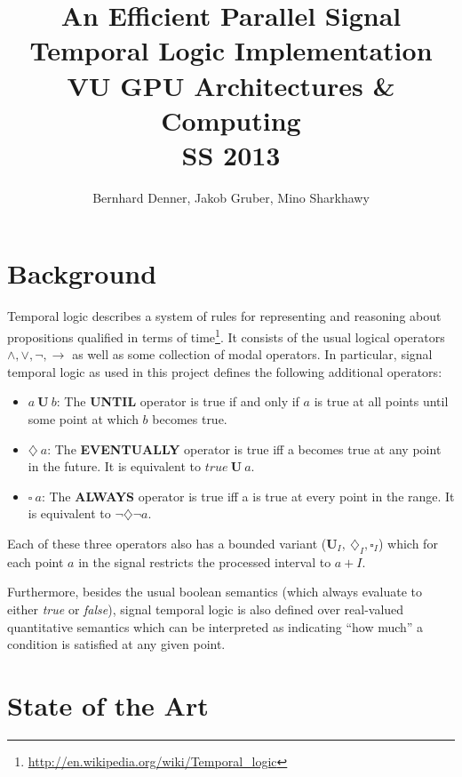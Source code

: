 \documentclass[a4paper,10pt]{article}
\title{
	An Efficient Parallel Signal Temporal Logic Implementation \\
    VU GPU Architectures \& Computing \\
    SS 2013
}
\author{
    Bernhard Denner,
    Jakob Gruber,
    Mino Sharkhawy
}
\renewcommand{\And}{\wedge}
\newcommand{\Or}{\vee}
\newcommand{\Neg}{\neg}
\newcommand{\Impl}{\rightarrow}
\newcommand{\Until}{\mathbf{U}}
\newcommand{\Evtl}{\diamondsuit}
\newcommand{\Alw}{\square}
\newcommand{\Buntil}{\mathbf{U}_I}
\newcommand{\Bevtl}{\diamondsuit_I}
\newcommand{\Balw}{\square_I}
\begin{document}
\begin{comment}
Problem statement, State of the art (semantics, ...), Sequential algorithms, Parallel ..., Test cases, benchmarks, How the project went, what we did.
\end{comment}

\maketitle
\pagebreak
\tableofcontents
\pagebreak

\section{Background}

Temporal logic describes a system of rules for representing and reasoning about propositions
qualified in terms of time\footnote{\url{http://en.wikipedia.org/wiki/Temporal_logic}}.
It consists of the usual logical operators $\And, \Or, \Neg, \Impl$ as well as
some collection of modal operators. In particular, signal temporal logic as used in this
project defines the following additional operators:

\begin{itemize}
\item $a \: \Until \: b$: The \textbf{UNTIL} operator is true if and only if $a$ is true
      at all points until some point at which $b$ becomes true.
\item $\Evtl \: a$: The \textbf{EVENTUALLY} operator is true iff a becomes true at any point
      in the future. It is equivalent to $\mathit{true} \: \Until \: a$.
\item $\Alw \: a$: The \textbf{ALWAYS} operator is true iff a is true at every point in the range.
      It is equivalent to $\neg \Evtl \neg a$.
\end{itemize}

Each of these three operators also has a bounded variant ($\Buntil, \: \Bevtl, \Balw$) which
for each point $a$ in the signal restricts the processed interval to $a + I$.

Furthermore, besides the usual boolean semantics (which always evaluate to either \textit{true} or
\textit{false}), signal temporal logic is also defined over real-valued quantitative semantics which
can be interpreted as indicating ``how much'' a condition is satisfied at any given point.

\section{State of the Art}
\end{document}
